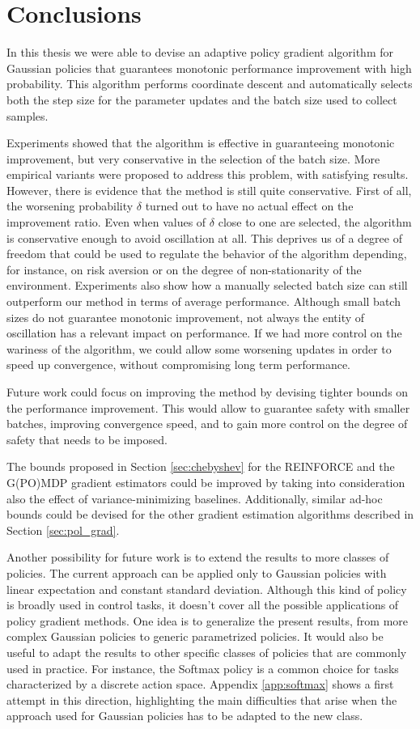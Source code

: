 \chapter{Conclusions}
In this thesis we were able to devise an adaptive policy gradient algorithm for Gaussian policies that guarantees monotonic performance improvement with high probability. This algorithm performs coordinate descent and automatically selects both the step size for the parameter updates and the batch size used to collect samples. 

Experiments showed that the algorithm is effective in guaranteeing monotonic improvement, but very conservative in the selection of the batch size. More empirical variants were proposed to address this problem, with satisfying results. However, there is evidence that the method is still quite conservative.
First of all, the worsening probability $\delta$ turned out to have no actual effect on the improvement ratio. Even when values of $\delta$ close to one are selected, the algorithm is conservative enough to avoid oscillation at all. This deprives us of a degree of freedom that could be used to regulate the behavior of the algorithm depending, for instance, on risk aversion or on the degree of non-stationarity of the environment.
Experiments also show how a manually selected batch size can still outperform our method in terms of average performance. Although small batch sizes do not guarantee monotonic improvement, not always the entity of oscillation has a relevant impact on performance. If we had more control on the wariness of the algorithm, we could allow some worsening updates in order to speed up convergence, without compromising long term performance.

Future work could focus on improving the method by devising tighter bounds on the performance improvement.
This would allow to guarantee safety with smaller batches, improving convergence speed, and to gain more control on the degree of safety that needs to be imposed.

The bounds proposed in Section \ref{sec:chebyshev} for the REINFORCE and the G(PO)MDP gradient estimators could be improved by taking into consideration also the effect of variance-minimizing baselines. Additionally, similar ad-hoc bounds could be devised for the other gradient estimation algorithms described in Section \ref{sec:pol_grad}.

Another possibility for future work is to extend the results to more classes of policies. The current approach can be applied only to Gaussian policies with linear expectation and constant standard deviation. Although this kind of policy is broadly used in control tasks, it doesn't cover all the possible applications of policy gradient methods. 
One idea is to generalize the present results, from more complex Gaussian policies to generic parametrized policies.
It would also be useful to adapt the results to other specific classes of policies that are commonly used in practice. For instance, the Softmax policy is a common choice for tasks characterized by a discrete action space. Appendix \ref{app:softmax} shows a first attempt in this direction, highlighting the main difficulties that arise when the approach used for Gaussian policies has to be adapted to the new class.

